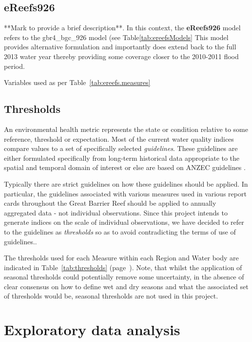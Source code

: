 \documentclass[a4paper]{AIMSreport}
\begin{document}
    
      

\subsection{eReefs926}

**Mark to provide a brief description**. In this context, the \textbf{eReefs926} model refers to the
gbr4\_bgc\_926 model (see Table\ref{tab:ereefsModels} This model provides alternative formulation
and importantly does extend back to the full 2013 water year thereby providing some coverage closer
to the 2010-2011 flood period.

Variables used as per Table~\ref{tab:ereefs.measures}

\subsection{Thresholds}

An environmental health metric represents the state or condition relative to some reference,
threshold or expectation.  Most of the current water quality indices compare values to a set of
specifically selected \textit{guidelines}.  These guidelines are either formulated specifically from
long-term historical data appropriate to the spatial and temporal domain of interest or else are
based on ANZEC guidelines \citep{ANZEC-2000}.
 
Typically there are strict guidelines on how these guidelines should be applied.  In particular, the
guidelines associated with various measures used in various report cards throughout the Great
Barrier Reef should be applied to annually aggregated data - not individual observations.  Since
this project intends to generate indices on the scale of individual observations, we have decided to
refer to the guidelines as \textit{thresholds} so as to avoid contradicting the terms of use of
guidelines..
 
The thresholds used for each Measure within each Region and Water body are indicated in
Table~\ref{tab:thresholds} (page~\pageref{tab:thresholds}).  Note, that whilst the application of
seasonal thresholds could potentially remove some uncertainty, in the absence of clear consensus on
how to define wet and dry seasons and what the associated set of thresholds would be, seasonal
thresholds are not used in this project.

\section{Exploratory data analysis}
\end{document}
